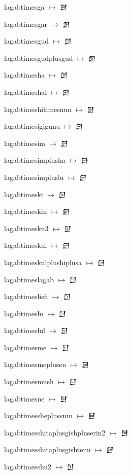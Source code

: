 {\noindent lagabtimesga $\mapsto$ {\cufont 𒇄}\par
\noindent lagabtimesgar $\mapsto$ {\cufont 𒇅}\par
\noindent lagabtimesgud $\mapsto$ {\cufont 𒇆}\par
\noindent lagabtimesgudplusgud $\mapsto$ {\cufont 𒇇}\par
\noindent lagabtimesha $\mapsto$ {\cufont 𒇈}\par
\noindent lagabtimeshal $\mapsto$ {\cufont 𒇉}\par
\noindent lagabtimeshitimesnun $\mapsto$ {\cufont 𒇊}\par
\noindent lagabtimesigigunu $\mapsto$ {\cufont 𒇋}\par
\noindent lagabtimesim $\mapsto$ {\cufont 𒇌}\par
\noindent lagabtimesimplusha $\mapsto$ {\cufont 𒇍}\par
\noindent lagabtimesimpluslu $\mapsto$ {\cufont 𒇎}\par
\noindent lagabtimeski $\mapsto$ {\cufont 𒇏}\par
\noindent lagabtimeskin $\mapsto$ {\cufont 𒇐}\par
\noindent lagabtimesku3 $\mapsto$ {\cufont 𒇑}\par
\noindent lagabtimeskul $\mapsto$ {\cufont 𒇒}\par
\noindent lagabtimeskulplushiplusa $\mapsto$ {\cufont 𒇓}\par
\noindent lagabtimeslagab $\mapsto$ {\cufont 𒇔}\par
\noindent lagabtimeslish $\mapsto$ {\cufont 𒇕}\par
\noindent lagabtimeslu $\mapsto$ {\cufont 𒇖}\par
\noindent lagabtimeslul $\mapsto$ {\cufont 𒇗}\par
\noindent lagabtimesme $\mapsto$ {\cufont 𒇘}\par
\noindent lagabtimesmeplusen $\mapsto$ {\cufont 𒇙}\par
\noindent lagabtimesmush $\mapsto$ {\cufont 𒇚}\par
\noindent lagabtimesne $\mapsto$ {\cufont 𒇛}\par
\noindent lagabtimessheplussum $\mapsto$ {\cufont 𒇜}\par
\noindent lagabtimesshitaplusgishpluserin2 $\mapsto$ {\cufont 𒇝}\par
\noindent lagabtimesshitaplusgishtenu $\mapsto$ {\cufont 𒇞}\par
\noindent lagabtimesshu2 $\mapsto$ {\cufont 𒇟}\par
}
